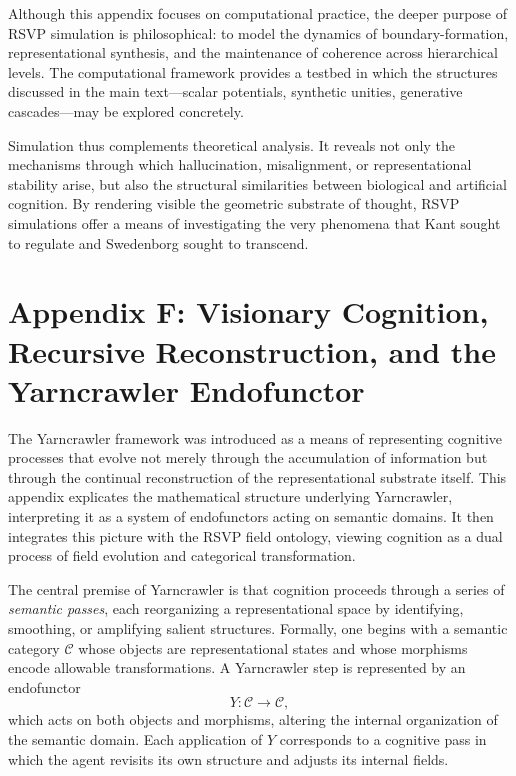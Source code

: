 \documentclass[12pt]{article}
\begin{document}
Although this appendix focuses on computational practice, the deeper purpose of 
RSVP simulation is philosophical: to model the dynamics of boundary-formation, 
representational synthesis, and the maintenance of coherence across hierarchical 
levels.  
The computational framework provides a testbed in which the structures 
discussed in the main text—scalar potentials, synthetic unities, generative 
cascades—may be explored concretely.

Simulation thus complements theoretical analysis. It reveals not only the 
mechanisms through which hallucination, misalignment, or representational 
stability arise, but also the structural similarities between biological and 
artificial cognition.  
By rendering visible the geometric substrate of thought, RSVP simulations offer 
a means of investigating the very phenomena that Kant sought to regulate and 
Swedenborg sought to transcend.

\newpage
\section*{Appendix F: Visionary Cognition, Recursive Reconstruction, and the Yarncrawler Endofunctor}

The Yarncrawler framework was introduced as a means of representing cognitive 
processes that evolve not merely through the accumulation of information but 
through the continual reconstruction of the representational substrate itself.  
This appendix explicates the mathematical structure underlying Yarncrawler, 
interpreting it as a system of endofunctors acting on semantic domains.  
It then integrates this picture with the RSVP field ontology, viewing cognition 
as a dual process of field evolution and categorical transformation.

The central premise of Yarncrawler is that cognition proceeds through a series 
of \emph{semantic passes}, each reorganizing a representational space by 
identifying, smoothing, or amplifying salient structures.  
Formally, one begins with a semantic category $\mathcal{C}$ whose objects are 
representational states and whose morphisms encode allowable transformations.  
A Yarncrawler step is represented by an endofunctor
\[
Y : \mathcal{C} \longrightarrow \mathcal{C},
\]
which acts on both objects and morphisms, altering the internal organization of 
the semantic domain.  Each application of $Y$ corresponds to a cognitive 
pass in which the agent revisits its own structure and adjusts its internal 
fields.
\end{document}
